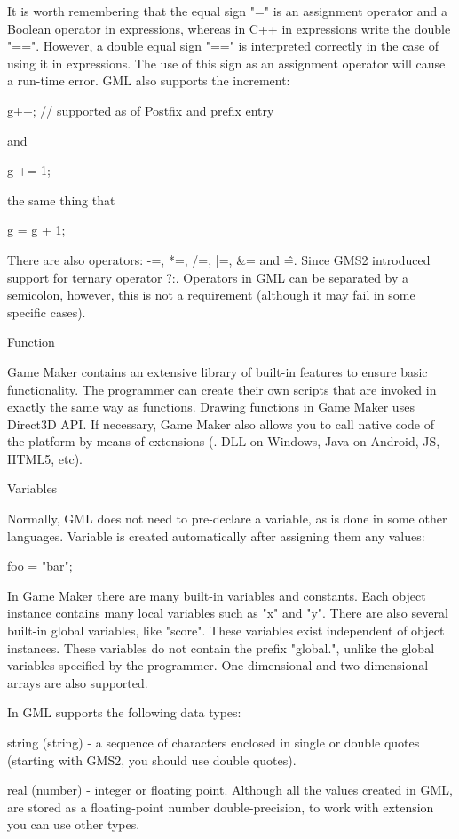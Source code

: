 \documentclass[12pt]{article}
\begin{document}
It is worth remembering that the equal sign "=" is an assignment operator and a Boolean operator in expressions, whereas in C++ in expressions write the double "==". However, a double equal sign "==" is interpreted correctly in the case of using it in expressions. The use of this sign as an assignment operator will cause a run-time error. GML also supports the increment:{}

g++; // supported as of Postfix and prefix entry{}

and{}

g += 1;{}

the same thing that{}

g = g + 1;{}

There are also operators: -=, *=, /=, |=, \&= and \^=. Since GMS2 introduced support for ternary operator ?:. Operators in GML can be separated by a semicolon, however, this is not a requirement (although it may fail in some specific cases).{}

Function{}

Game Maker contains an extensive library of built-in features to ensure basic functionality. The programmer can create their own scripts that are invoked in exactly the same way as functions. Drawing functions in Game Maker uses Direct3D API. If necessary, Game Maker also allows you to call native code of the platform by means of extensions (. DLL on Windows, Java on Android, JS, HTML5, etc).{}

Variables{}

Normally, GML does not need to pre-declare a variable, as is done in some other languages. Variable is created automatically after assigning them any values:{}

foo = "bar";{}

In Game Maker there are many built-in variables and constants. Each object instance contains many local variables such as "x" and "y". There are also several built-in global variables, like "score". These variables exist independent of object instances. These variables do not contain the prefix "global.", unlike the global variables specified by the programmer. One-dimensional and two-dimensional arrays are also supported.{}

In GML supports the following data types:{}

string (string) - a sequence of characters enclosed in single or double quotes (starting with GMS2, you should use double quotes).{}

real (number) - integer or floating point. Although all the values created in GML, are stored as a floating-point number double-precision, to work with extension you can use other types.{}
\end{document}
